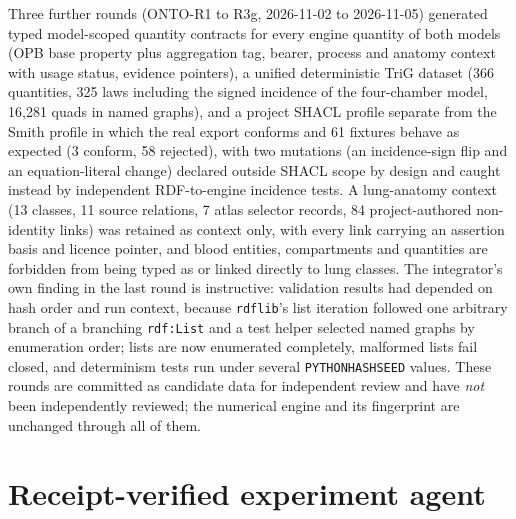 \documentclass[11pt,letterpaper]{article}
\newcommand{\pkg}[1]{\texttt{#1}}
\begin{document}
Three further rounds (ONTO-R1 to R3g, 2026-11-02 to 2026-11-05) generated typed model-scoped quantity contracts for every engine quantity of both models (OPB base property plus aggregation tag, bearer, process and anatomy context with usage status, evidence pointers), a unified deterministic TriG dataset (366 quantities, 325 laws including the signed incidence of the four-chamber model, 16,281 quads in named graphs), and a project SHACL profile separate from the Smith profile in which the real export conforms and 61 fixtures behave as expected (3 conform, 58 rejected), with two mutations (an incidence-sign flip and an equation-literal change) declared outside SHACL scope by design and caught instead by independent RDF-to-engine incidence tests. A lung-anatomy context (13 classes, 11 source relations, 7 atlas selector records, 84 project-authored non-identity links) was retained as context only, with every link carrying an assertion basis and licence pointer, and blood entities, compartments and quantities are forbidden from being typed as or linked directly to lung classes. The integrator's own finding in the last round is instructive: validation results had depended on hash order and run context, because \pkg{rdflib}'s list iteration followed one arbitrary branch of a branching \pkg{rdf:List} and a test helper selected named graphs by enumeration order; lists are now enumerated completely, malformed lists fail closed, and determinism tests run under several \pkg{PYTHONHASHSEED} values. These rounds are committed as candidate data for independent review and have \emph{not} been independently reviewed; the numerical engine and its fingerprint are unchanged through all of them.

\section{Receipt-verified experiment agent}
\label{sec:agent}
\end{document}
